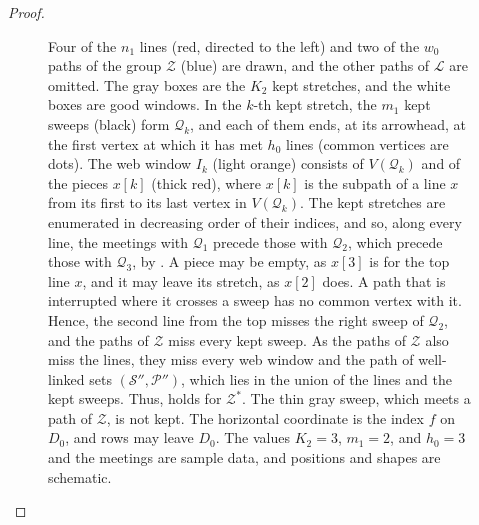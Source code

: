 \documentclass[fontsize=12pt,leading=14pt]{fullpaper}
\newcommand{\Lcal}{\mathcal{L}}
\newcommand{\Pcal}{\mathcal{P}}
\newcommand{\Qcal}{\mathcal{Q}}
\newcommand{\Scal}{\mathcal{S}}
\newcommand{\Zcal}{\mathcal{Z}}
\begin{document}
\begin{proof}
\begin{figure}[ht]
{      Four of the $n_1$ lines (red, directed to the left) and two of the $w_0$ paths of the group $\Zcal$ (blue) are drawn, and the other paths of $\Lcal$ are omitted.
      The gray boxes are the $K_2$ kept stretches, and the white boxes are good windows.
      In the $k$-th kept stretch, the $m_1$ kept sweeps (black) form $\Qcal_k$, and each of them ends, at its arrowhead, at the first vertex at which it has met $h_0$ lines (common vertices are dots).
      The web window $I_k$ (light orange) consists of $V(\Qcal_k)$ and of the pieces $x[k]$ (thick red), where $x[k]$ is the subpath of a line $x$ from its first to its last vertex in $V(\Qcal_k)$.
      The kept stretches are enumerated in decreasing order of their indices, and so, along every line, the meetings with $\Qcal_1$ precede those with $\Qcal_2$, which precede those with $\Qcal_3$, by .
      A piece may be empty, as $x[3]$ is for the top line $x$, and it may leave its stretch, as $x[2]$ does.
      A path that is interrupted where it crosses a sweep has no common vertex with it.
      Hence, the second line from the top misses the right sweep of $\Qcal_2$, and the paths of $\Zcal$ miss every kept sweep.
      As the paths of $\Zcal$ also miss the lines, they miss every web window and the path of well-linked sets $(\Scal'',\Pcal'')$, which lies in the union of the lines and the kept sweeps.
      Thus,  holds for $\Zcal^*$.
      The thin gray sweep, which meets a path of $\Zcal$, is not kept.
      The horizontal coordinate is the index $f$ on $D_0$, and rows may leave $D_0$.
    The values $K_2=3$, $m_1=2$, and $h_0=3$ and the meetings are sample data, and positions and shapes are schematic.}
    \label{fig:stage2-hole-web}
  \end{figure}


\end{proof}
\end{document}
